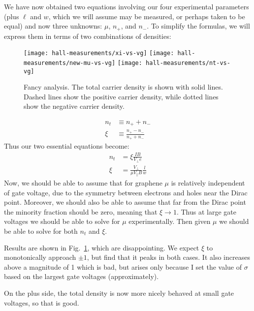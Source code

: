 \documentclass[twocolumn]{revtex4-1}
\begin{document}
We have now obtained two equations involving our four experimental
parameters (plus $\ell$ and $w$, which we will assume may be measured,
or perhaps taken to be equal) and now three unknowns:  $\mu$, $n_+$,
and $n_-$.  To simplify the formulas, we will express them in terms of
two combinations of densities:
\begin{figure}
  \texttt{[image: hall-measurements/xi-vs-vg]}
  \texttt{[image: hall-measurements/new-mu-vs-vg]}
  \texttt{[image: hall-measurements/nt-vs-vg]}
  \caption{Fancy analysis.  The total carrier density is shown with
    solid lines.  Dashed lines show the positive carrier density,
    while dotted lines show the negative carrier density.}
  \label{fig:nice}
\end{figure}
\begin{align}
  n_t &\equiv n_+ + n_- \\
  \xi &\equiv \frac{n_+ - n_-}{n_+ + n_-}
\end{align}
Thus our two essential equations become:
\begin{align}
  n_t &= \xi\frac{IB}{V_\perp e} \\
  \xi  &= \frac{V_\perp}{\mu V_\parallel B}\frac{l}{w}
\end{align}
Now, we should be able to assume that for graphene $\mu$ is
relatively independent of gate voltage, due to the symmetry between
electrons and holes near the Dirac point.  Moreover, we should also be
able to assume that far from the Dirac point the minority fraction
should be zero, meaning that $\xi \rightarrow 1$.  Thus at large gate
voltages we should be able to solve for $\mu$ experimentally.  Then
given $\mu$ we should be able to solve for both $n_t$ and $\xi$.

Results are shown in Fig.~\ref{fig:nice}, which are disappointing.  We
expect $\xi$ to monotonically approach $\pm 1$, but find that it peaks
in both cases.  It also increases above a magnitude of 1 which is bad,
but arises only because I set the value of $\sigma$ based on the
largest gate voltages (approximately).

On the plus side, the total density is now more nicely behaved at
small gate voltages, so that is good.
\end{document}
